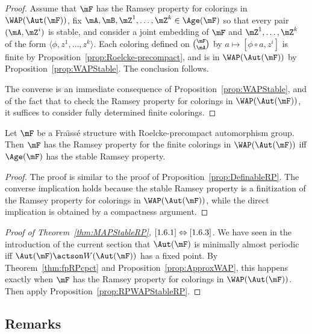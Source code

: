 \begin{proof}
Assume that $\mF$ has the Ramsey property for colorings in $\WAP(\Aut(\mF))$, fix $\mA, \mB, \mZ^{1},\ldots,\mZ^{k}\in \Age(\mF)$ so that every pair $(\mA, \mZ^{i})$ is stable, and consider a joint embedding of $\mF$ and $\mZ^{1},\ldots,\mZ^{k}$ of the form $\langle \phi,z^{1},\ldots,z^{k}\rangle$. Each coloring defined on $\binom{\mF}{\mA}$ by $a\mapsto [\phi \circ a, z^{i}]$ is finite by Proposition~\ref{prop:Roelcke-precompact}, and is in $\WAP(\Aut(\mF))$ by Proposition~\ref{prop:WAPStable}. The conclusion follows.

The converse is an immediate consequence of Proposition~\ref{prop:WAPStable}, and of the fact that to check the Ramsey property for colorings in $\WAP(\Aut(\mF))$, it suffices to consider fully determined finite colorings.
\end{proof}

\begin{prop}\label{prop:RPWAPStableRP}
Let $\mF$ be a Fra\"{\i}ss\'e structure with Roelcke-precompact automorphism group. Then $\mF$ has the Ramsey property for the finite colorings in $\WAP(\Aut(\mF))$ iff $\Age(\mF)$ has the stable Ramsey property.
\end{prop}

\begin{proof}
The proof is similar to the proof of Proposition~\ref{prop:DefinableRP}. The converse implication holds because the stable Ramsey property is a finitization of the Ramsey property for colorings in $\WAP(\Aut(\mF))$, while the direct implication is obtained by a compactness argument.
\end{proof}

\begin{proof}[Proof of Theorem~\ref{thm:MAPStableRP}, $\eqref{1.6.1}\Leftrightarrow\eqref{1.6.3}$]
We have seen in the introduction of the current section that $\Aut(\mF)$ is minimally almost periodic iff $\Aut(\mF)\actson W(\Aut(\mF))$ has a fixed point. By Theorem~\ref{thm:fpRPcpct} and Proposition~\ref{prop:ApproxWAP}, this happens exactly when $\mF$ has the Ramsey property for colorings in $\WAP(\Aut(\mF))$. Then apply Propo\-sition~\ref{prop:RPWAPStableRP}.
\end{proof}

\subsection{Remarks}

